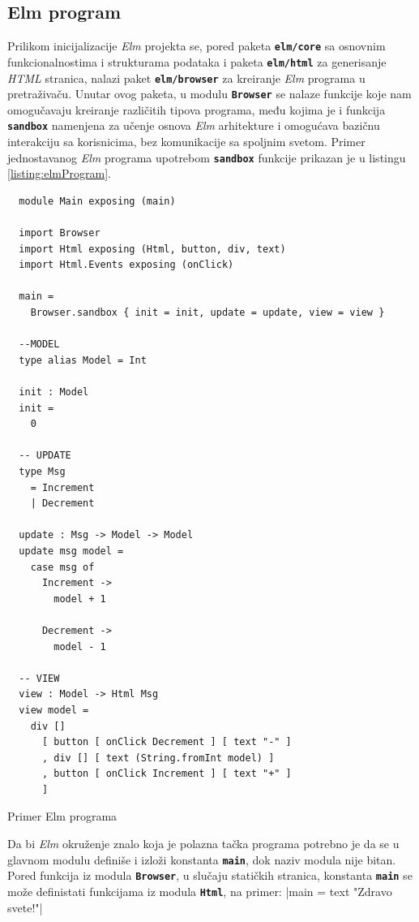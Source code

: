 \documentclass[12pt,oneside]{memoir}
\begin{document}
\subsection{Elm program}
Prilikom inicijalizacije \emph{Elm} projekta se, pored paketa \texttt{\textbf{elm/core}} sa
osnovnim funkcionalnostima i strukturama podataka i paketa \texttt{\textbf{elm/html}} za
generisanje \emph{HTML} stranica, nalazi paket \texttt{\textbf{elm/browser}} za kreiranje \emph{Elm}
programa u pretraživaču. Unutar ovog paketa, u modulu \texttt{\textbf{Browser}} se nalaze
funkcije koje nam omogučavaju kreiranje različitih tipova programa, među kojima je i
funkcija \texttt{\textbf{sandbox}} namenjena za učenje osnova \emph{Elm} arhitekture i
omogućava bazičnu interakciju sa korisnicima, bez komunikacije sa spoljnim svetom.
Primer jednostavanog \emph{Elm} programa upotrebom \texttt{\textbf{sandbox}} funkcije prikazan
je u listingu \ref{listing:elmProgram}.
\begin{listing}[h!]
\begin{verbatim}
  module Main exposing (main)

  import Browser
  import Html exposing (Html, button, div, text)
  import Html.Events exposing (onClick)
  
  main =
    Browser.sandbox { init = init, update = update, view = view }

  --MODEL
  type alias Model = Int
  
  init : Model
  init =
    0
  
  -- UPDATE
  type Msg
    = Increment
    | Decrement
  
  update : Msg -> Model -> Model
  update msg model =
    case msg of
      Increment ->
        model + 1
  
      Decrement ->
        model - 1
  
  -- VIEW
  view : Model -> Html Msg
  view model =
    div []
      [ button [ onClick Decrement ] [ text "-" ]
      , div [] [ text (String.fromInt model) ]
      , button [ onClick Increment ] [ text "+" ]
      ]
\end{verbatim}
\caption{Primer Elm programa}
\label{listing:elmProgram}
\end{listing}

Da bi \emph{Elm} okruženje znalo koja je polazna tačka programa potrebno je da se u glavnom
modulu definiše i izloži konstanta \textbf{\texttt{main}}, dok naziv modula nije bitan.
Pored funkcija iz modula \texttt{\textbf{Browser}}, u slučaju statičkih stranica, konstanta 
\textbf{\texttt{main}} se može definistati funkcijama iz modula \texttt{\textbf{Html}},
na primer: |main = text "Zdravo svete!"|
\end{document}
